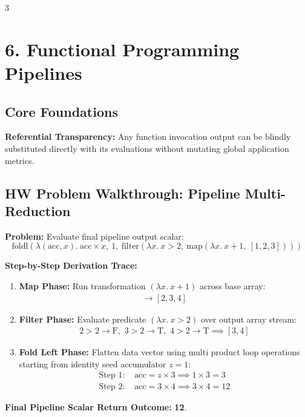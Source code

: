 \documentclass[8.5pt,landscape,a4paper]{article}
\begin{document}
\begin{multicols*}{3}
\section{6. Functional Programming Pipelines}
\subsection{Core Foundations}
\textbf{Referential Transparency:} Any function invocation output can be blindly substituted directly with its evaluations without mutating global application metrics.

\subsection{HW Problem Walkthrough: Pipeline Multi-Reduction}
\textbf{Problem:} Evaluate final pipeline output scalar:
$$\text{foldl}(\lambda(\text{acc}, x).\ \text{acc} \times x, \ 1, \ \text{filter}(\lambda x.\ x > 2, \ \text{map}(\lambda x.\ x + 1, \ [1, 2, 3])))$$

\textbf{Step-by-Step Derivation Trace:}
\begin{enumerate}
    \item \textbf{Map Phase:} Run transformation $(\lambda x.\ x + 1)$ across base array:
    \begin{align*}
        [1 + 1, \ 2 + 1, \ 3 + 1] \longrightarrow [2, 3, 4]
    \end{align*}
    \item \textbf{Filter Phase:} Evaluate predicate $(\lambda x.\ x > 2)$ over output array stream:
    \begin{align*}
        2 > 2 \rightarrow \text{F}, \,\, 3 > 2 \rightarrow \text{T}, \,\, 4 > 2 \rightarrow \text{T} \implies [3, 4]
    \end{align*}
    \item \textbf{Fold Left Phase:} Flatten data vector using multi product loop operations starting from identity seed accumulator $z = 1$:
    \begin{align*}
        \text{Step 1: } & \text{acc} = z \times 3 \implies 1 \times 3 = 3 \\
        \text{Step 2: } & \text{acc} = 3 \times 4 \implies 3 \times 4 = 12
    \end{align*}
\end{enumerate}
\textbf{Final Pipeline Scalar Return Outcome:} \textbf{12}.


\end{multicols*}
\end{document}

